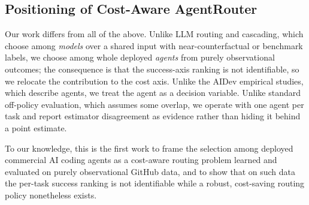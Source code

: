 \subsection{Positioning of Cost-Aware AgentRouter}

Our work differs from all of the above. Unlike LLM routing and cascading, which choose among \emph{models} over a shared input with near-counterfactual or benchmark labels, we choose among whole deployed \emph{agents} from purely observational outcomes; the consequence is that the success-axis ranking is not identifiable, so we relocate the contribution to the cost axis. Unlike the AIDev empirical studies, which describe agents, we treat the agent as a decision variable. Unlike standard off-policy evaluation, which assumes some overlap, we operate with one agent per task and report estimator disagreement as evidence rather than hiding it behind a point estimate.

To our knowledge, this is the first work to frame the selection among deployed commercial AI coding agents as a cost-aware routing problem learned and evaluated on purely observational GitHub data, and to show that on such data the per-task success ranking is not identifiable while a robust, cost-saving routing policy nonetheless exists.
